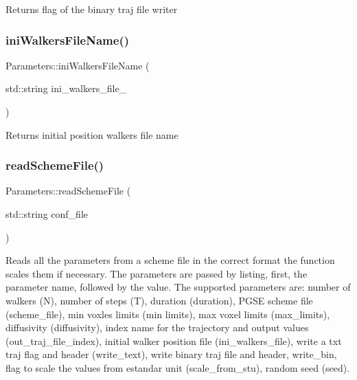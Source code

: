\begin{DoxyReturn}{Returns}
flag of the binary traj file writer 
\end{DoxyReturn}
\mbox{\label{class_parameters_a73d64bb093a93c2b806883f5504d8fb5}} 
\subsubsection{\texorpdfstring{ini\+Walkers\+File\+Name()}{iniWalkersFileName()}}
{\footnotesize\ttfamily Parameters\+::ini\+Walkers\+File\+Name (\begin{DoxyParamCaption}\item[{std\+::string}]{ini\+\_\+walkers\+\_\+file\+\_\+ }\end{DoxyParamCaption})}

\begin{DoxyReturn}{Returns}
initial position walkers file name 
\end{DoxyReturn}
\mbox{\label{class_parameters_afa8dd9d59fa727c3c2b2fe366efb2c14}} 
\subsubsection{\texorpdfstring{read\+Scheme\+File()}{readSchemeFile()}}
{\footnotesize\ttfamily Parameters\+::read\+Scheme\+File (\begin{DoxyParamCaption}\item[{std\+::string}]{conf\+\_\+file }\end{DoxyParamCaption})}



Reads all the parameters from a scheme file in the correct format the function scales them if necessary. The parameters are passed by listing, first, the parameter name, followed by the value. The supported parameters are\+: number of walkers (N), number of steps (T), duration (duration), P\+G\+SE scheme file (scheme\+\_\+file), min voxles limits (min limits), max voxel limits (max\+\_\+limits), diffusivity (diffusivity), index name for the trajectory and output values (out\+\_\+traj\+\_\+file\+\_\+index), initial walker position file (ini\+\_\+walkers\+\_\+file), write a txt traj flag and header (write\+\_\+text), write binary traj file and header, write\+\_\+bin, flag to scale the values from estandar unit (scale\+\_\+from\+\_\+stu), random seed (seed). 


